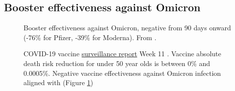 \documentclass[11pt,a4paper,notitlepage]{report}
\begin{document}
\clearpage

\subsection*{Booster effectiveness against Omicron}

\begin{figure}[h]
    \centering
    \caption{Booster effectiveness against Omicron, negative from 90 days onward (-76\% for Pfizer, -39\% for Moderna). From \citet{Hansen2021.12.20.21267966}.}
    \label{fig:Omicron-vaccine}
\end{figure}


\begin{figure}[h]
    \centering
    \caption{COVID-19 vaccine \href{https://assets.publishing.service.gov.uk/government/uploads/system/uploads/attachment_data/file/1061532/Vaccine_surveillance_report_-_week_11.pdf}{surveillance report} Week 11 \cite{ukhsa17032022}. Vaccine absolute death risk reduction for under 50 year olds is between 0\% and 0.0005\%. Negative vaccine effectiveness against Omicron infection aligned with \citet{Hansen2021.12.20.21267966} (Figure \ref{fig:Omicron-vaccine})}
    \label{fig:UK-report-w11}
\end{figure}





\end{document}
